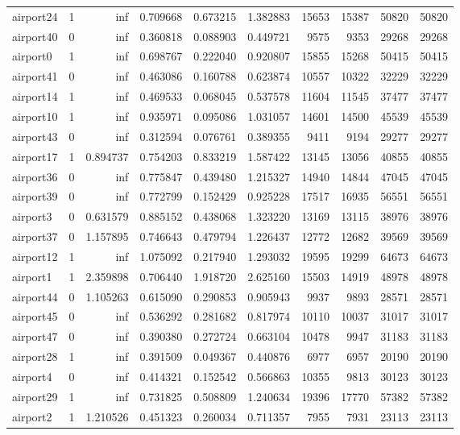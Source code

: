 \begin{longtable}{|l|r|r|r|r|r|r|r|r|r|}
airport24 & 1 & inf & 0.709668 & 0.673215 & 1.382883 & 15653 & 15387 & 50820 & 50820 \\
airport40 & 0 & inf & 0.360818 & 0.088903 & 0.449721 & 9575 & 9353 & 29268 & 29268 \\
airport0 & 1 & inf & 0.698767 & 0.222040 & 0.920807 & 15855 & 15268 & 50415 & 50415 \\
airport41 & 0 & inf & 0.463086 & 0.160788 & 0.623874 & 10557 & 10322 & 32229 & 32229 \\
airport14 & 1 & inf & 0.469533 & 0.068045 & 0.537578 & 11604 & 11545 & 37477 & 37477 \\
airport10 & 1 & inf & 0.935971 & 0.095086 & 1.031057 & 14601 & 14500 & 45539 & 45539 \\
airport43 & 0 & inf & 0.312594 & 0.076761 & 0.389355 & 9411 & 9194 & 29277 & 29277 \\
airport17 & 1 & 0.894737 & 0.754203 & 0.833219 & 1.587422 & 13145 & 13056 & 40855 & 40855 \\
airport36 & 0 & inf & 0.775847 & 0.439480 & 1.215327 & 14940 & 14844 & 47045 & 47045 \\
airport39 & 0 & inf & 0.772799 & 0.152429 & 0.925228 & 17517 & 16935 & 56551 & 56551 \\
airport3 & 0 & 0.631579 & 0.885152 & 0.438068 & 1.323220 & 13169 & 13115 & 38976 & 38976 \\
airport37 & 0 & 1.157895 & 0.746643 & 0.479794 & 1.226437 & 12772 & 12682 & 39569 & 39569 \\
airport12 & 1 & inf & 1.075092 & 0.217940 & 1.293032 & 19595 & 19299 & 64673 & 64673 \\
airport1 & 1 & 2.359898 & 0.706440 & 1.918720 & 2.625160 & 15503 & 14919 & 48978 & 48978 \\
airport44 & 0 & 1.105263 & 0.615090 & 0.290853 & 0.905943 & 9937 & 9893 & 28571 & 28571 \\
airport45 & 0 & inf & 0.536292 & 0.281682 & 0.817974 & 10110 & 10037 & 31017 & 31017 \\
airport47 & 0 & inf & 0.390380 & 0.272724 & 0.663104 & 10478 & 9947 & 31183 & 31183 \\
airport28 & 1 & inf & 0.391509 & 0.049367 & 0.440876 & 6977 & 6957 & 20190 & 20190 \\
airport4 & 0 & inf & 0.414321 & 0.152542 & 0.566863 & 10355 & 9813 & 30123 & 30123 \\
airport29 & 1 & inf & 0.731825 & 0.508809 & 1.240634 & 19396 & 17770 & 57382 & 57382 \\
airport2 & 1 & 1.210526 & 0.451323 & 0.260034 & 0.711357 & 7955 & 7931 & 23113 & 23113 \\

\end{longtable}
